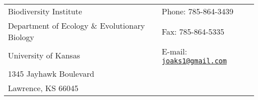 \documentclass[10pt]{article}
\begin{document}
\raggedright
\setlength{\parindent}{0.25in}
\singlespacing

\begin{tabular}{ @{} p{3.75in} p{3in} @{}}
Biodiversity Institute                                               & Phone: 785-864-3439 \\
Department of Ecology \& Evolutionary Biology  & Fax: 785-864-5335 \\
University of Kansas                                              & E-mail: \href{joaks1@gmail.com}{\tt joaks1@gmail.com} \\
1345 Jayhawk Boulevard                                       & \\
Lawrence, KS 66045                                              & \\
\end{tabular}
\end{document}
